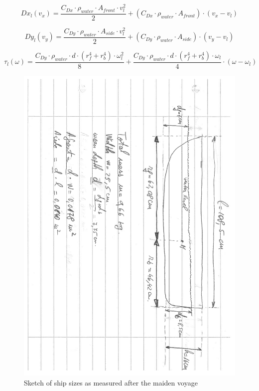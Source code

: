 \[ Dx_{l}(v_{x}) = \frac{C_{Dx}\cdot\rho_{water}\cdot A_{front}\cdot v_{l}^{2}}{2} + (C_{Dx}\cdot\rho_{water}\cdot A_{front})\cdot (v_{x}-v_{l}) \]

\[ Dy_{l}(v_{y}) = \frac{C_{Dy}\cdot\rho_{water}\cdot A_{side}\cdot v_{l}^{2}}{2} + (C_{Dy}\cdot\rho_{water}\cdot A_{side})\cdot (v_{y}-v_{l}) \]

\[ \tau_{l}(\omega) = \frac{C_{Dy} \cdot \rho_{water} \cdot d \cdot (r_{f}^{4} + r_{b}^{4}) \cdot \omega_{l}^{2}}{8} + \frac{C_{Dy} \cdot \rho_{water} \cdot d \cdot (r_{f}^{4} + r_{b}^{4}) \cdot \omega_{l}}{4} \cdot (\omega - \omega_{l}) \] 

\begin{figure}[htbp]
	\centering
	\includegraphics[width=\textwidth, trim=1.8cm 0cm 0cm 2cm, clip = true, angle = 90, width=\textwidth]{img/ship_sizes}
	\caption{Sketch of ship sizes as measured after the maiden voyage}
	\label{fig:ship_sizes}
\end{figure}

